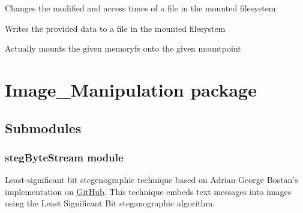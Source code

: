 \documentclass[letterpaper,10pt,english]{sphinxmanual}
\begin{document}
\begin{fulllineitems}
\begin{fulllineitems}
\end{fulllineitems}


\begin{fulllineitems}
\label{File_System:File_System.memfuse.MemFS.utimens}
Changes the modified and access times of a file in the mounted filesystem

\end{fulllineitems}


\begin{fulllineitems}
\label{File_System:File_System.memfuse.MemFS.write}
Writes the provided data to a file in the mounted filesystem

\end{fulllineitems}


\end{fulllineitems}


\begin{fulllineitems}
\label{File_System:File_System.memfuse.mount}
Actually mounts the given memoryfs onto the given mountpoint

\end{fulllineitems}



\section{Image\_Manipulation package}
\label{Image_Manipulation::doc}\label{Image_Manipulation:image-manipulation-package}

\subsection{Submodules}
\label{Image_Manipulation:submodules}

\subsubsection{stegByteStream module}
\label{Image_Manipulation:stegbytestream-module}
Least-significant bit stegenographic technique based on Adrian-George Bostan's implementation on \href{https://github.com/adrg/lsbsteg/blob/master/lsbsteg.py}{GitHub}. This technique embeds text messages into images using the Least Significant Bit steganographic algorithm.
\end{document}
